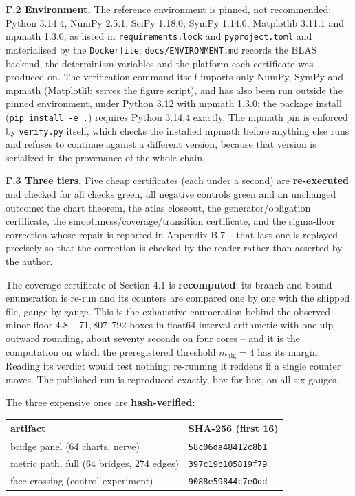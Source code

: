 \textbf{F.2 Environment.} The reference environment is pinned, not recommended: Python 3.14.4, NumPy 2.5.1, SciPy 1.18.0, SymPy 1.14.0, Matplotlib 3.11.1 and mpmath 1.3.0, as listed in \texttt{requirements.\allowbreak{}lock} and \texttt{pyproject.\allowbreak{}toml} and materialised by the \texttt{Dockerfile}; \texttt{docs/\allowbreak{}ENVIRONMENT.\allowbreak{}md} records the BLAS backend, the determinism variables and the platform each certificate was produced on. The verification command itself imports only NumPy, SymPy and mpmath (Matplotlib serves the figure script), and has also been run outside the pinned environment, under Python 3.12 with mpmath 1.3.0; the package install (\texttt{pip\ install\ -\allowbreak{}e\ .\allowbreak{}}) requires Python 3.14.4 exactly. The mpmath pin is enforced by \texttt{verify.\allowbreak{}py} itself, which checks the installed mpmath before anything else runs and refuses to continue against a different version, because that version is serialized in the provenance of the whole chain.

\textbf{F.3 Three tiers.} Five cheap certificates (each under a second) are \textbf{re-executed} and checked for all checks green, all negative controls green and an unchanged outcome: the chart theorem, the atlas closeout, the generator/obligation certificate, the smoothness/coverage/transition certificate, and the sigma-floor correction whose repair is reported in Appendix B.7 -- that last one is replayed precisely so that the correction is checked by the reader rather than asserted by the author.

The coverage certificate of Section 4.1 is \textbf{recomputed}: its branch-and-bound enumeration is re-run and its counters are compared one by one with the shipped file, gauge by gauge. This is the exhaustive enumeration behind the observed minor floor \(4.8\) -- \(71{,}807{,}792\) boxes in float64 interval arithmetic with one-ulp outward rounding, about seventy seconds on four cores -- and it is the computation on which the preregistered threshold \(m_{\mathrm{alg}} = 4\) has its margin. Reading its verdict would test nothing; re-running it reddens if a single counter moves. The published run is reproduced exactly, box for box, on all six gauges.

The three expensive ones are \textbf{hash-verified}:

\begin{longtable}[]{@{}ll@{}}
\toprule\noalign{}
artifact & SHA-256 (first 16) \\
\midrule\noalign{}
\endhead
\bottomrule\noalign{}
\endlastfoot
bridge panel (64 charts, nerve) & \texttt{58c06da48412c8b1} \\
metric path, full (64 bridges, 274 edges) & \texttt{397c19b105819f79} \\
face crossing (control experiment) & \texttt{9088e59844c7e0dd} \\
\end{longtable}

